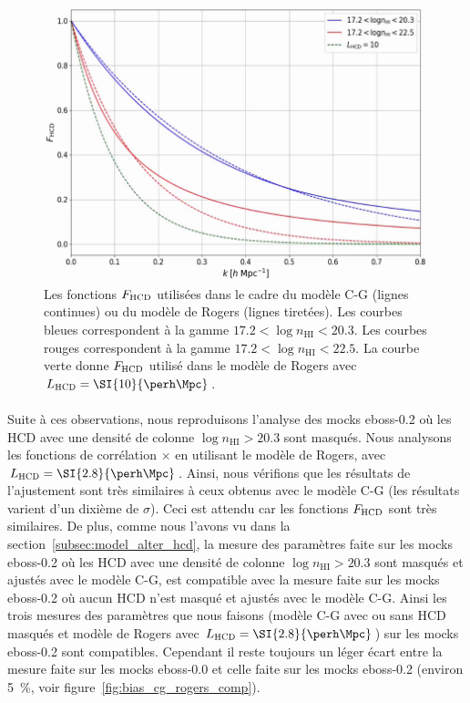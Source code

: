 \begin{figure}
  \centering
  \includegraphics[scale=0.4]{f_hcd_range}
  \caption{Les fonctions $F_{\textsc{HCD}}$ utilisées dans le cadre du modèle C-G (lignes continues) ou du modèle de Rogers (lignes tiretées).
    Les courbes bleues correspondent à la gamme $\num{17.2} < \log n_{\mathrm{HI}} < \num{20.3}$. Les courbes rouges correspondent à la gamme $\num{17.2} < \log n_{\mathrm{HI}} < \num{22.5}$. La courbe verte donne $F_{\textsc{HCD}}$ utilisé dans le modèle de Rogers avec $L_{\textsc{HCD}} = \SI{10}{\perh\Mpc}$.
}
  \label{fig:f_hcd_range}
\end{figure}

\paragraph{}
Suite à ces observations, nous reproduisons l'analyse des mocks eboss-0.2 où les HCD avec une densité de colonne $\log n_{\mathrm{HI}} > \num{20.3}$ sont masqués. Nous analysons les fonctions de corrélation \lya{}$\times$\lya{} en utilisant le modèle de Rogers, avec $L_{\textsc{HCD}} = \SI{2.8}{\perh\Mpc}$. Ainsi, nous vérifions que les résultats de l'ajustement sont très similaires à ceux obtenus avec le modèle C-G (les résultats varient d'un dixième de $\sigma$). Ceci est attendu car les fonctions $F_{\textsc{HCD}}$ sont très similaires.
De plus, comme nous l'avons vu dans la section~\ref{subsec:model_alter_hcd}, la mesure des paramètres \lya{} faite sur les mocks eboss-0.2 où les HCD avec une densité de colonne $\log n_{\mathrm{HI}} > \num{20.3}$ sont masqués et ajustés avec le modèle C-G, est compatible avec la mesure faite sur les mocks eboss-0.2 où aucun HCD n'est masqué et ajustés avec le modèle C-G. Ainsi les trois mesures des paramètres \lya{} que nous faisons (modèle C-G avec ou sans HCD masqués et modèle de Rogers avec $L_{\textsc{HCD}} = \SI{2.8}{\perh\Mpc}$) sur les mocks eboss-0.2 sont compatibles.
Cependant il reste toujours un léger écart entre la mesure faite sur les mocks eboss-0.0 et celle faite sur les mocks eboss-0.2 (environ \SI{5}{\percent}, voir figure~\ref{fig:bias_cg_rogers_comp}).

